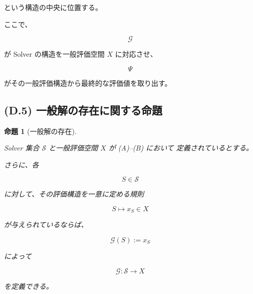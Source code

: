 \documentclass[a4paper,11pt]{article}
\newtheorem{proposition}[definition]{命題}
\newcommand{\Solver}{\mathcal{S}}
\begin{document}
という構造の中央に位置する。

ここで、

\begin{equation}
    \mathcal{G}
\end{equation}

が Solver の構造を一般評価空間 $X$ に対応させ、

\begin{equation}
    \Psi
\end{equation}

がその一般評価構造から最終的な評価値を取り出す。


\subsection{(D.5) 一般解の存在に関する命題}
\label{subsec:D5}

\begin{proposition}[一般解の存在]
\label{prop:D-general-solution-existence}

Solver 集合 $\Solver$ と一般評価空間 $X$ が (A)--(B) において
定義されているとする。

さらに、各

\begin{equation}
    S\in\Solver
\end{equation}

に対して、その評価構造を一意に定める規則

\begin{equation}
    S
    \longmapsto
    x_S
    \in X
\end{equation}

が与えられているならば、

\begin{equation}
    \mathcal{G}(S):=x_S
\end{equation}

によって

\begin{equation}
    \mathcal{G}:
    \Solver
    \longrightarrow
    X
\end{equation}

を定義できる。
\end{proposition}
\end{document}

